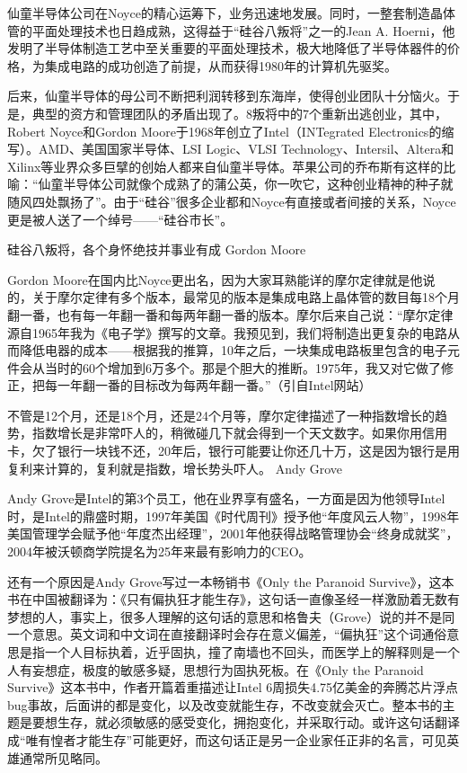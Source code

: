 \documentclass[12pt,UTF8]{ctexbook}
\begin{document}
仙童半导体公司在Noyce的精心运筹下，业务迅速地发展。同时，一整套制造晶体管的平面处理技术也日趋成熟，这得益于“硅谷八叛将”之一的Jean A. Hoerni，他发明了半导体制造工艺中至关重要的平面处理技术，极大地降低了半导体器件的价格，为集成电路的成功创造了前提，从而获得1980年的计算机先驱奖。

后来，仙童半导体的母公司不断把利润转移到东海岸，使得创业团队十分恼火。于是，典型的资方和管理团队的矛盾出现了。8叛将中的7个重新出逃创业，其中，Robert Noyce和Gordon Moore于1968年创立了Intel（INTegrated Electronics的缩写）。AMD、美国国家半导体、LSI Logic、VLSI Technology、Intersil、Altera和Xilinx等业界众多巨擘的创始人都来自仙童半导体。苹果公司的乔布斯有这样的比喻：“仙童半导体公司就像个成熟了的蒲公英，你一吹它，这种创业精神的种子就随风四处飘扬了”。由于“硅谷”很多企业都和Noyce有直接或者间接的关系，Noyce更是被人送了一个绰号——“硅谷市长”。

硅谷八叛将，各个身怀绝技并事业有成
Gordon Moore

Gordon Moore在国内比Noyce更出名，因为大家耳熟能详的摩尔定律就是他说的，关于摩尔定律有多个版本，最常见的版本是集成电路上晶体管的数目每18个月翻一番，也有每一年翻一番和每两年翻一番的版本。摩尔后来自己说：“摩尔定律源自1965年我为《电子学》撰写的文章。我预见到，我们将制造出更复杂的电路从而降低电器的成本——根据我的推算，10年之后，一块集成电路板里包含的电子元件会从当时的60个增加到6万多个。那是个胆大的推断。1975年，我又对它做了修正，把每一年翻一番的目标改为每两年翻一番。”（引自Intel网站）

不管是12个月，还是18个月，还是24个月等，摩尔定律描述了一种指数增长的趋势，指数增长是非常吓人的，稍微碰几下就会得到一个天文数字。如果你用信用卡，欠了银行一块钱不还，20年后，银行可能要让你还几十万，这是因为银行是用复利来计算的，复利就是指数，增长势头吓人。
Andy Grove

Andy Grove是Intel的第3个员工，他在业界享有盛名，一方面是因为他领导Intel时，是Intel的鼎盛时期，1997年美国《时代周刊》授予他“年度风云人物”，1998年美国管理学会赋予他“年度杰出经理”，2001年他获得战略管理协会“终身成就奖”，2004年被沃顿商学院提名为25年来最有影响力的CEO。

还有一个原因是Andy Grove写过一本畅销书《Only the Paranoid Survive》，这本书在中国被翻译为：《只有偏执狂才能生存》，这句话一直像圣经一样激励着无数有梦想的人，事实上，很多人理解的这句话的意思和格鲁夫（Grove）说的并不是同一个意思。英文词和中文词在直接翻译时会存在意义偏差，“偏执狂”这个词通俗意思是指一个人目标执着，近乎固执，撞了南墙也不回头，而医学上的解释则是一个人有妄想症，极度的敏感多疑，思想行为固执死板。在《Only the Paranoid Survive》这本书中，作者开篇着重描述让Intel 6周损失4.75亿美金的奔腾芯片浮点bug事故，后面讲的都是变化，以及改变就能生存，不改变就会灭亡。整本书的主题是要想生存，就必须敏感的感受变化，拥抱变化，并采取行动。或许这句话翻译成“唯有惶者才能生存”可能更好，而这句话正是另一企业家任正非的名言，可见英雄通常所见略同。
\end{document}
